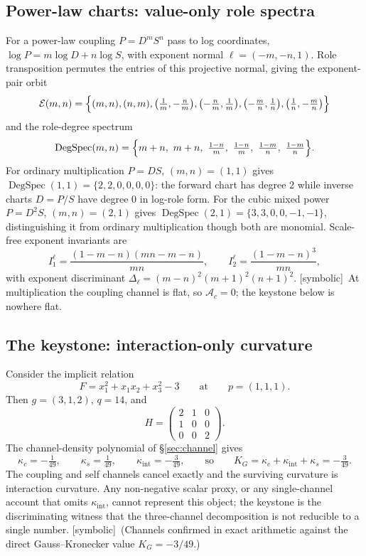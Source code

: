 \documentclass[11pt]{article}
\newcommand{\Symbolic}{\textsf{[symbolic]}}
\theoremstyle{plain}
\theoremstyle{definition}
\newcommand{\KG}{K_{G}}
\newcommand{\Ac}{\mathcal{A}_c}
\newcommand{\kc}{\kappa_{c}}
\newcommand{\kint}{\kappa_{\mathrm{int}}}
\newcommand{\ks}{\kappa_{s}}
\begin{document}
\subsection{Power-law charts: value-only role spectra}
For a power-law coupling $P=D^mS^n$ pass to log coordinates, $\log P=m\log D+n\log S$, with exponent
normal $\ell=(-m,-n,1)$. Role transposition permutes the entries of this projective normal, giving the
exponent-pair orbit
\[
\mathcal E(m,n)=\Bigl\{(m,n),(n,m),\bigl(\tfrac1m,-\tfrac nm\bigr),\bigl(-\tfrac nm,\tfrac1m\bigr),
\bigl(-\tfrac mn,\tfrac1n\bigr),\bigl(\tfrac1n,-\tfrac mn\bigr)\Bigr\}
\]
and the role-degree spectrum
\[
\operatorname{DegSpec}(m,n)=\Bigl\{m+n,\ m+n,\ \tfrac{1-n}{m},\ \tfrac{1-n}{m},\ \tfrac{1-m}{n},\
\tfrac{1-m}{n}\Bigr\}.
\]
For ordinary multiplication $P=DS$, $(m,n)=(1,1)$ gives $\operatorname{DegSpec}(1,1)=\{2,2,0,0,0,0\}$:
the forward chart has degree $2$ while inverse charts $D=P/S$ have degree $0$ in log-role form. For
the cubic mixed power $P=D^2S$, $(m,n)=(2,1)$ gives
$\operatorname{DegSpec}(2,1)=\{3,3,0,0,-1,-1\}$, distinguishing it from ordinary multiplication though
both are monomial. Scale-free exponent invariants are
\[
I_1^\ell=\frac{(1-m-n)(mn-m-n)}{mn},\qquad
I_2^\ell=\frac{(1-m-n)^3}{mn},
\]
with exponent discriminant $\Delta_\ell=(m-n)^2(m+1)^2(n+1)^2$. \Symbolic\ At
multiplication the coupling channel is flat, so $\Ac=0$; the keystone below is nowhere flat.

\subsection{The keystone: interaction-only curvature}
Consider the implicit relation
\[
F=x_1^2+x_1x_2+x_3^2-3\qquad\text{at}\qquad p=(1,1,1).
\]
Then $g=(3,1,2)$, $q=14$, and
\[
H=\begin{pmatrix}2&1&0\\1&0&0\\0&0&2\end{pmatrix}.
\]
The channel-density polynomial of \S\ref{sec:channel} gives
\[
\kc=-\tfrac1{49},\qquad \ks=\tfrac1{49},\qquad \kint=-\tfrac3{49},
\qquad\text{so}\qquad \KG=\kc+\kint+\ks=-\tfrac3{49}.
\]
The coupling and self channels cancel exactly and the surviving curvature is interaction curvature.
Any non-negative scalar proxy, or any single-channel account that omits $\kint$, cannot represent this
object; the keystone is the discriminating witness that the three-channel decomposition is not
reducible to a single number. \Symbolic\ (Channels confirmed in exact arithmetic against the direct
Gauss--Kronecker value $\KG=-3/49$.)
\end{document}
